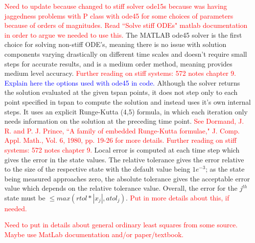 \documentclass[12pt]{article}
\begin{document}
\textcolor{red}{Need to update because changed to stiff solver ode15s because was having jaggedness problems with P class with ode45 for some choices of parameters because of orders of magnitudes. Read ``Solve stiff ODEs" matlab documentation in order to argue we needed to use this.}
The MATLAB ode45 solver is the first choice for solving non-stiff ODE's, meaning there is no issue with solution components varying drastically on different time scales and doesn't require small steps for accurate results, and is a medium order method, meaning provides medium level accuracy. \textcolor{red}{Further reading on stiff systems: 572 notes chapter 9.} %
\textcolor{blue}{Explain here the options used with ode45 in code.} Although the solver returns the solution evaluated at the given tspan points, it does not step only to each point specified in tspan to compute the solution and instead uses it's own internal steps. %
It uses an explicit Runge-Kutta (4,5) formula, in which each iteration only needs information on the solution at the preceding time point. \textcolor{red}{See Dormand, J. R. and P. J. Prince, ``A family of embedded Runge-Kutta formulae," J. Comp. Appl. Math., Vol. 6, 1980, pp. 19-26 for more details.}  \textcolor{red}{Further reading on stiff systems: 572 notes chapter 9.} Local error is computed at each time step which gives the error in the state values. The relative tolerance gives the error relative to the size of the respective state with the default value being $1e^{-3}$; as the state being measured approaches zero, the absolute tolerance gives the acceptable error value which depends on the relative tolerance value. Overall, the error for the $j^{th}$ state must be $\leq max(rtol*|x_j|, atol_j).$ \textcolor{red}{Put in more details about this, if needed.}%

\textcolor{red}{Need to put in details about general ordinary least squares from some source. Maybe use MatLab documentation and/or paper/textbook.} 
\end{document}
